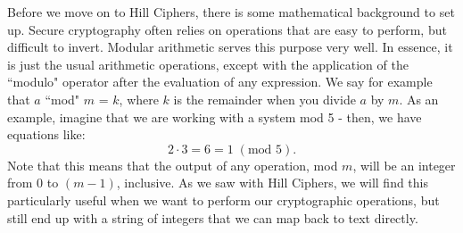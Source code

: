 \documentclass{article}
\begin{document}
Before we move on to Hill Ciphers, there is some mathematical background to set up. Secure cryptography often relies on operations that are easy to perform, but difficult to invert. Modular arithmetic serves this purpose very well. In essence, it is just the usual arithmetic operations, except with the application of the ``modulo" operator after the evaluation of any expression. We say for example that $a$ ``mod" $m$ = $k$, where $k$ is the remainder when you divide $a$ by $m$. As an example, imagine that we are working with a system mod 5 - then, we have equations like:
\[
    2 \cdot 3 = 6 = 1 \; (\text{mod } 5).
\]
Note that this means that the output of any operation, mod $m$, will be an integer from $0$ to $(m - 1)$, inclusive. As we saw with Hill Ciphers, we will find this particularly useful when we want to perform our cryptographic operations, but still end up with a string of integers that we can map back to text directly.
\end{document}
